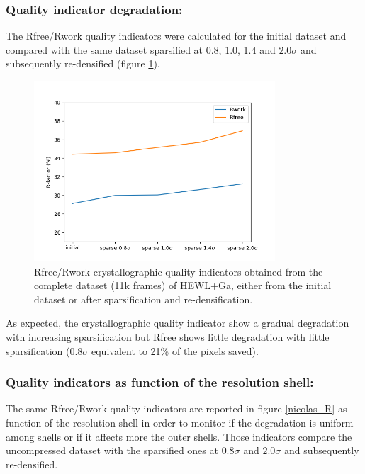 \documentclass[preprint]{iucr}              %
\begin{document}
\subsubsection{Quality indicator degradation:}
The Rfree/Rwork quality indicators \cite{Rfree} were calculated for the initial dataset and compared with the same dataset sparsified at 0.8, 1.0, 1.4 and $2.0\sigma$ and subsequently re-densified (figure \ref{Rfree}). 

\begin{figure}
\label{Rfree}
\begin{center}
\includegraphics[width=9cm]{fig_Rfree}
\caption{Rfree/Rwork crystallographic quality indicators obtained from the complete dataset (11k frames) of HEWL+Ga, either from the initial dataset or after sparsification and re-densification.}
\end{center}
\end{figure}
As expected, the crystallographic quality indicator show a gradual degradation with increasing sparsification but Rfree shows little degradation with little sparsification ($0.8\sigma$ equivalent to 21\% of the pixels saved).

\subsubsection{Quality indicators as function of the resolution shell:}
The same Rfree/Rwork quality indicators are reported in figure \ref{nicolas_R} as function of the resolution shell in order to monitor if the degradation is uniform among shells or if it affects more the outer shells.
Those indicators compare the uncompressed dataset with the sparsified ones at $0.8\sigma$ and $2.0\sigma$ and subsequently re-densified.
\end{document}
